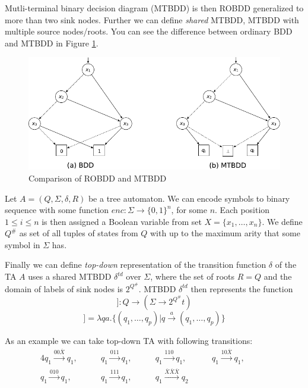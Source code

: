 \documentclass[a4paper, 12pt]{article}
\begin{document}
Mutli-terminal binary decision diagram (MTBDD) is then ROBDD generalized to more than two sink nodes. Further we can define \textit{shared} MTBDD, MTBDD with multiple source nodes/roots. You can see the difference between ordinary BDD and MTBDD in Figure \ref{fig:15860}. %

\begin{figure}[h]
	\centering
	\includegraphics[width=0.7\linewidth]{15860.pdf}
	\caption{Comparison of ROBDD and MTBDD \cite{fiedor:wsks}}
	\label{fig:15860}
\end{figure}

Let $A=(Q, \Sigma, \delta, R)$ be a tree automaton. We can encode symbols to binary sequence with some function $enc: \Sigma \rightarrow \{0, 1\}^n$, for some $n$. Each position $1\leq i \leq n$ is then assigned a Boolean variable from set $X = \{x_1, \dots, x_n\}$. We define $Q^\#$ as set of all tuples of states from $Q$ with up to the maximum arity that some symbol in $\Sigma$ has.

Finally we can define \textit{top-down} representation of the transition function $\delta$ of the TA $A$ uses a shared MTBDD $\delta^{td}$ over $\Sigma$, where the set of roots $R=Q$ and the domain of labels of sink nodes is $2^{Q^\#}$. MTBDD $\delta^{td}$ then represents the function
\begin{equation*}
[[ \delta^{td}]]  : Q \rightarrow (\Sigma \rightarrow 2^{Q^\#}t)
\end{equation*}
\begin{equation*}
[[ \delta^{td}]]   = \lambda q a . \{(q_1, \dots, q_p) | q \xrightarrow{a} (q_1, \dots, q_p) \} 
\end{equation*}

As an example we can take top-down TA with following transitions:
\begin{alignat*}{4}
q_1 \xrightarrow{00\overline{X}} q_1, \qquad &
q_1 \xrightarrow{011} q_1, \qquad & 
q_1 \xrightarrow{110} q_1, \qquad &
q_1 \xrightarrow{10\overline{X}} q_1, \qquad & \\
q_1 \xrightarrow{010} q_1, \qquad &
q_1 \xrightarrow{111} q_1, \qquad &
q_1 \xrightarrow{\overline{X}\overline{X}\overline{X}} q_2 \qquad &  &\\
\end{alignat*}
\end{document}
